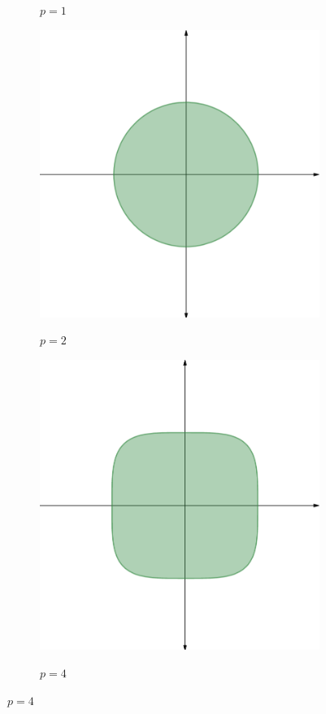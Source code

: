\begin{figure}
\begin{subfigure}{0.2\textwidth}
	\label{norm_1_figure}
	\caption*{$p = 1$}
	\end{subfigure}\hspace{0.5cm}
	\begin{subfigure}{0.2\textwidth}
	\centering
	\includegraphics[width = \textwidth]{figures/norm_2.png}
	\label{norm_2_figure}
	\caption*{$p = 2$}
	\end{subfigure}\hspace{0.5cm}
	\begin{subfigure}{0.2\textwidth}
	\centering
	\includegraphics[width = \textwidth]{figures/norm_4.png}
	\label{norm_4_figure}
	\caption*{$p = 4$}
	\end{subfigure}


\end{figure}
